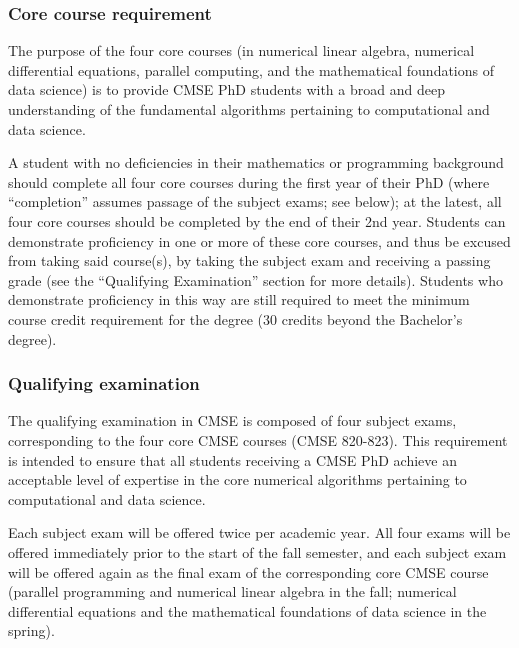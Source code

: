 \vspace{3mm}
\subsubsection{Core course requirement}

The purpose of the four core courses (in numerical linear algebra,
numerical differential equations, parallel computing, and the
mathematical foundations of data science) is to provide CMSE PhD
students with a broad and deep understanding of the fundamental
algorithms pertaining to computational and data science.

A student with no deficiencies in their mathematics or programming
background should complete all four core courses during the first year
of their PhD (where ``completion'' assumes passage of the subject exams;
see below); at the latest, all four core courses should be completed
by the end of their 2nd year.  Students can demonstrate proficiency in
one or more of these core courses, and thus be excused from taking
said course(s), by taking the subject exam and receiving a passing
grade (see the ``Qualifying Examination'' section for more details).
Students who demonstrate proficiency in this way are still required to
meet the minimum course credit requirement for the degree (30 credits
beyond the Bachelor's degree).

\vspace{3mm}
\subsubsection{Qualifying examination}
\label{sec:qual_exam}

The qualifying examination in CMSE is composed of four subject exams,
corresponding to the four core CMSE courses (CMSE 820-823). This
requirement is intended to ensure that all students receiving a CMSE
PhD achieve an acceptable level of expertise in the core numerical
algorithms pertaining to computational and data science.  

Each subject exam will be offered twice per academic year.  All four
exams will be offered immediately prior to the start of the fall
semester, and each subject exam will be offered again as the final
exam of the corresponding core CMSE course (parallel programming and
numerical linear algebra in the fall; numerical differential equations
and the mathematical foundations of data science in the spring).

